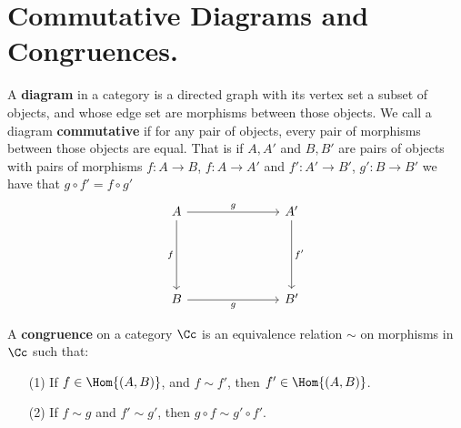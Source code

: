 
\section{Commutative Diagrams and Congruences.}

\begin{definition}
    A \textbf{diagram} in a category is a directed graph with its vertex set a
    subset of objects, and whose edge set are morphisms between those objects.
    We call a diagram \textbf{commutative} if for any pair of objects, every
    pair of morphisms between those objects are equal. That is if $A,A'$ and
    $B,B'$ are pairs of objects with pairs of morphisms  $f:A \xrightarrow{}
    B$, $f:A \xrightarrow{} A'$ and $f':A' \xrightarrow{} B'$, $g':B
    \xrightarrow{} B'$ we have that $g \circ f'=f \circ g'$
            \[\begin{tikzcd}
                A &&& {A'} \\
                \\
                \\
                B &&& {B'}
                \arrow["g", from=1-1, to=1-4]
                \arrow["{f'}", from=1-4, to=4-4]
                \arrow["f"', from=1-1, to=4-1]
                \arrow["g"', from=4-1, to=4-4]
            \end{tikzcd}\]
\end{definition}

\begin{definition}
    A \textbf{congruence} on a category $\Cc$ is an equivalence relation $\sim$
    on morphisms in  $\Cc$ such that:
    \begin{enumerate}
        \item[(1)] If $f \in \Hom{(A,B)}$, and $f \sim f'$, then $f' \in
            \Hom{(A,B)}$.

        \item[(2)] If $f \sim g$ and  $f' \sim g'$, then  $g \circ f \sim g'
            \circ f'$.
    \end{enumerate}
\end{definition}

